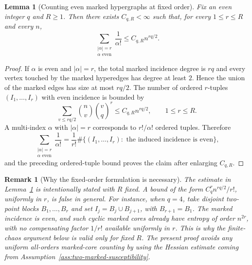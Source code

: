 \documentclass[11pt]{article}
\newtheorem{lemma}[theorem]{Lemma}
\newtheorem{remark}[theorem]{Remark}
\begin{document}
\begin{lemma}[Counting even marked hypergraphs at fixed order]
  \label{lem:even-marked-count}
  Fix an even integer $q$ and $R\geq1$.  Then there exists
  $C_{q,R}<\infty$ such that, for every $1\leq r\leq R$ and every $n$,
  \begin{equation}\label{eq:even-marked-count}
    \sum_{\substack{|\alpha|=r\\ \alpha\text{ even}}}\frac1{\alpha!}
    \leq
    C_{q,R}n^{rq/2}.
  \end{equation}
\end{lemma}

\begin{proof}
  If $\alpha$ is even and $|\alpha|=r$, the total marked incidence degree is
  $rq$ and every vertex touched by the marked hyperedges has degree at least
  $2$.  Hence the union of the marked edges has size at most $rq/2$.  The number
  of ordered $r$-tuples $(I_1,\ldots,I_r)$ with even incidence is bounded by
  \begin{equation}\label{eq:ordered-even-count}
    \sum_{v\leq rq/2}\binom{n}{v}\binom{v}{q}^r
    \leq C_{q,R}n^{rq/2},
    \qquad 1\leq r\leq R.
  \end{equation}
  A multi-index $\alpha$ with $|\alpha|=r$ corresponds to $r!/\alpha!$
  ordered tuples.  Therefore
  \begin{equation}\label{eq:multiindex-from-ordered-count}
    \sum_{\substack{|\alpha|=r\\ \alpha\text{ even}}}\frac1{\alpha!}
    =
    \frac1{r!}
    \#\{(I_1,\ldots,I_r):\text{ the induced incidence is even}\},
  \end{equation}
  and the preceding ordered-tuple bound proves the claim after enlarging
  $C_{q,R}$.
\end{proof}

\begin{remark}[Why the fixed-order formulation is necessary]
  The estimate in Lemma~\ref{lem:even-marked-count} is intentionally stated
  with $R$ fixed.  A bound of the form $C_q^rn^{rq/2}/r!$, uniformly in $r$, is
  false in general.  For instance, when $q=4$, take disjoint two-point blocks
  $B_1,\ldots,B_r$ and set $I_j=B_j\cup B_{j+1}$, with $B_{r+1}=B_1$.  The
  marked incidence is even, and such cyclic marked cores already have entropy
  of order $n^{2r}$, with no compensating factor $1/r!$ available uniformly in
  $r$.  This is why the finite-chaos argument below is valid only for fixed
  $R$.  The present proof avoids any uniform all-orders marked-core counting by
  using the Hessian estimate coming from
  Assumption~\ref{ass:two-marked-susceptibility}.
\end{remark}
\end{document}
